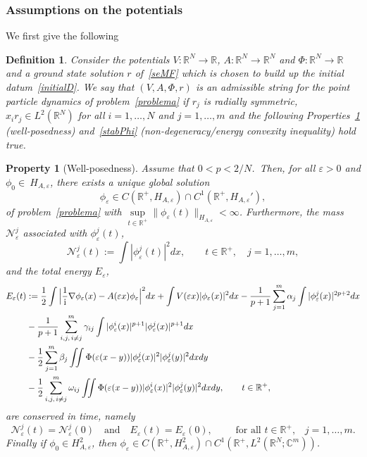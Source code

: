 \documentclass[11pt]{amsart}
\numberwithin{equation}{section}
\newtheorem{property}[theorem]{Property}
\newtheorem{definition}[theorem]{Definition}
\theoremstyle{definition}
\begin{document}
\subsubsection{Assumptions on the potentials}

We first give the following

\begin{definition}
    \label{defadmissibilityy}
Consider the potentials $V:{{\mathbb R}}^N\to{{\mathbb R}}$, $A:{{\mathbb R}}^N\to{{\mathbb R}}^N$ and $\Phi:{{\mathbb R}}^N\to{{\mathbb R}}$ and a ground state solution $r$
of~\eqref{seMF} which is chosen to build up the initial datum~\eqref{initialD}.
We say that $(V,A,\Phi,r)$ is an admissible string for
the point particle dynamics of problem~\eqref{problema} if $r_j$ is radially symmetric,
$x_ir_j\in L^2({{\mathbb R}}^N)$ for all $i=1,\dots,N$ and $j=1,\dots,m$ and the following
Properties~\ref{wellP} (well-posedness) and~\ref{stabPhi}
(non-degeneracy/energy convexity inequality) hold true.
\end{definition}

\begin{property}[Well-posedness]
\label{wellP}
Assume that $0<p<2/N$.\ Then, for all ${\varepsilon}>0$ and
$\phi_0\in\ H_{A,{\varepsilon}}$, there exists a unique global solution
$$
\phi_{\varepsilon}\in C({{\mathbb R}}^+,H_{A,{\varepsilon}})\cap C^1({{\mathbb R}}^+,H_{A,{\varepsilon}}'),
$$
of problem~\eqref{problema} with
$\sup\limits_{t\in{{\mathbb R}}^+}\|\phi_{\varepsilon}(t)\|_{H_{A,{\varepsilon}}}<\infty$.
Furthermore, the mass ${\mathcal N}_{\varepsilon}^j$ associated with $\phi_{\varepsilon}^j(t)$,
\begin{equation*}
{\mathcal N}_{\varepsilon}^j(t):=\int |\phi_{\varepsilon}^j(t)|^{2}dx, \qquad
t\in{{\mathbb R}}^+, \quad j=1,\dots, m,
\end{equation*}
and  the total energy $E_{\varepsilon}$,
\begin{align*}
 E_{\varepsilon}(t) &
   :=\frac{1}{2}\int\Big|\frac{1}{{\rm i}}\nabla \phi_{\varepsilon}(x)-A({\varepsilon} x)\phi_{\varepsilon}\Big|^2dx
  +\int V({\varepsilon} x)|\phi_{\varepsilon}(x)|^2dx
-\frac{1}{p+1}\sum_{j=1}^m\alpha_j\int |\phi_{\varepsilon}^j(x)|^{2p+2}dx  \\
& -\frac{1}{p+1}\sum_{i,j,\,i\neq j}^m \gamma_{ij}\int |\phi_{\varepsilon}^i(x)|^{p+1}|\phi_{\varepsilon}^j(x)|^{p+1}dx \notag \\
& -\frac{1}{2}\sum_{j=1}^m\beta_j \iint \Phi({\varepsilon}(x-y))|\phi_{\varepsilon}^j(x)|^2|\phi_{\varepsilon}^j(y)|^2 dx dy \\
& -\frac{1}{2}\sum_{i,j,\,i\neq j}^m\omega_{ij} \iint
\Phi({\varepsilon}(x-y))|\phi_{\varepsilon}^i(x)|^2|\phi_{\varepsilon}^j(y)|^2 dx dy,  \qquad t\in{{\mathbb R}}^+,
\end{align*}
are conserved in time, namely
$$
{\mathcal N}_{\varepsilon}^j(t)={\mathcal N}_{\varepsilon}^j(0)\quad\text{and}\quad E_{\varepsilon}(t)=
E_{\varepsilon}(0),\qquad\text{ for all $t\in{{\mathbb R}}^+$,} \quad j=1,\dots,m.
$$
Finally if $\phi_0\in H_{A,{\varepsilon}}^2$, then $\phi_{\varepsilon}\in
C({{\mathbb R}}^+,H_{A,{\varepsilon}}^2)\cap C^1({{\mathbb R}}^+,L^2({{\mathbb R}}^N;{{\mathbb C}}^m))$.
\end{property}
\end{document}
